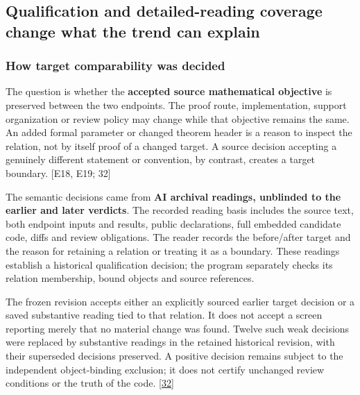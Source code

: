 \subsection[Qualification and detailed-reading coverage change what the trend can explain]{\texorpdfstring{\protect\hypertarget{c4}{}Qualification and detailed-reading coverage change what the trend can explain}{Qualification and detailed-reading coverage change what the trend can explain}}
\subsubsection[How target comparability was decided]{\texorpdfstring{\protect\hypertarget{c4-1}{}How target comparability was decided}{How target comparability was decided}}
The question is whether the \textbf{accepted source mathematical objective} is preserved between the two endpoints. The proof route, implementation, support organization or review policy may change while that objective remains the same. An added formal parameter or changed theorem header is a reason to inspect the relation, not by itself proof of a changed target. A source decision accepting a genuinely different statement or convention, by contrast, creates a target boundary. [E18, E19; 32]

The semantic decisions came from \textbf{AI archival readings, unblinded to the earlier and later verdicts}. The recorded reading basis includes the source text, both endpoint inputs and results, public declarations, full embedded candidate code, diffs and review obligations. The reader records the before/after target and the reason for retaining a relation or treating it as a boundary. These readings establish a historical qualification decision; the program separately checks its relation membership, bound objects and source references.

The frozen revision accepts either an explicitly sourced earlier target decision or a saved substantive reading tied to that relation. It does not accept a screen reporting merely that no material change was found. Twelve such weak decisions were replaced by substantive readings in the retained historical revision, with their superseded decisions preserved. A positive decision remains subject to the independent object-binding exclusion; it does not certify unchanged review conditions or the truth of the code. \href{en.pdf\#ref-32}{\mbox{[32]}}

